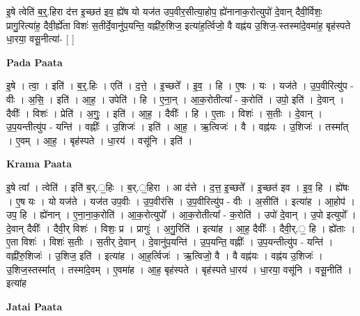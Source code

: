 \documentclass[17pt]{extarticle}
\begin{document}
इ॒षे त्वेति॑ ब॒र्॒.हिरा द॑त्त इ॒च्छत॑ इव॒ ह्ये॑ष यो यज॑त उप॒वीर॒सीत्या॒होप॒ ह्ये॑नानाक॒रोत्युपो॑ दे॒वान् दैवी॒र्विशः॒ प्रागु॒रित्या॑ह॒ दैवी॒र्ह्ये॑ता विशः॑ स॒तीर्दे॒वानु॑प॒यन्ति॒ वह्नी॑रु॒शिज॒ इत्या॑ह॒र्त्विजो॒ वै वह्न॑य उ॒शिज॒-स्तस्मा॑दे॒वमा॑ह॒ बृह॑स्पते धा॒रया॒ वसू॒नीत्या॑- [  ] \newline

\textbf{Pada Paata} \newline

इ॒षे । त्वा॒ । इति॑ । ब॒र्॒.हिः । एति॑ । द॒त्ते॒ । इ॒च्छते᳚ । इ॒व॒ । हि । ए॒षः । यः । यज॑ते । उ॒प॒वीरित्यु॑प - वीः । अ॒सि॒ । इति॑ । आ॒ह॒ । उपेति॑ । हि । ए॒ना॒न् । आ॒क॒रोतीत्या᳚ - क॒रोति॑ । उपो॒ इति॑ । दे॒वान् । दैवीः᳚ । विशः॑ । प्रेति॑ । अ॒गुः॒ । इति॑ । आ॒ह॒ । दैवीः᳚ । हि । ए॒ताः । विशः॑ । स॒तीः । दे॒वान् । उ॒प॒यन्तीत्यु॑प - यन्ति॑ । वह्नीः᳚ । उ॒शिजः॑ । इति॑ । आ॒ह॒ । ऋ॒त्विजः॑ । वै । वह्न॑यः । उ॒शिजः॑ । तस्मा᳚त् । ए॒वम् । आ॒ह॒ । बृह॑स्पते । धा॒रय॑ । वसू॑नि । इति॑ ।  \newline


\textbf{Krama Paata} \newline

इ॒षे त्वा᳚ । त्वेति॑ । इति॑ ब॒र्.॒हिः । ब॒र्.॒हिरा । आ द॑त्ते । द॒त्त॒ इ॒च्छते᳚ । इ॒च्छत॑ इव । इ॒व॒ हि । ह्ये॑षः । ए॒ष यः । यो यज॑ते । यज॑त उप॒वीः । उ॒प॒वीर॑सि । उ॒प॒वीरित्यु॑प - वीः । अ॒सीति॑ । इत्या॑ह । आ॒होप॑ । उप॒ हि । ह्ये॑नान् । ए॒ना॒ना॒क॒रोति॑ । आ॒क॒रोत्युपो᳚ । आ॒क॒रोतीत्या᳚ - क॒रोति॑ । उपो॑ दे॒वान् । उ॒पो इत्युपो᳚ । दे॒वान् दैवीः᳚ । दैवी॒र् विशः॑ । विशः॒ प्र । प्रागुः॑ । अ॒गु॒रिति॑ । इत्या॑ह । आ॒ह॒ दैवीः᳚ । दैवी॒र्.॒ हि । ह्ये॑ताः । ए॒ता विशः॑ । विशः॑ स॒तीः । स॒तीर् दे॒वान् । दे॒वानु॑प॒यन्ति॑ । उ॒प॒यन्ति॒ वह्नीः᳚ । उ॒प॒यन्तीत्यु॑प - यन्ति॑ । वह्नी॑रु॒शिजः॑ । उ॒शिज॒ इति॑ । इत्या॑ह । आ॒ह॒र्त्विजः॑ । ऋ॒त्विजो॒ वै । वै वह्न॑यः । वह्न॑य उ॒शिजः॑ । उ॒शिज॒स्तस्मा᳚त् । तस्मा॑दे॒वम् । ए॒वमा॑ह । आ॒ह॒ बृह॑स्पते । बृह॑स्पते धा॒रय॑ । धा॒रया॒ वसू॑नि । वसू॒नीति॑ । इत्या॑ह \newline

\textbf{Jatai Paata} \newline
\end{document}
